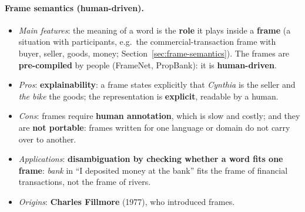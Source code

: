 \paragraph{Frame semantics (human-driven).}
\begin{itemize}[nosep]
  \item \emph{Main features}: the meaning of a word is the \textbf{role} it plays inside
        a \textbf{frame} (a situation with participants, e.g.\ the commercial-transaction
        frame with buyer, seller, goods, money; Section~\ref{sec:frame-semantics}). The
        frames are \textbf{pre-compiled} by people (FrameNet, PropBank): it is
        \textbf{human-driven}.
  \item \emph{Pros}: \textbf{explainability}: a frame states explicitly that \emph{Cynthia}
        is the seller and \emph{the bike} the goods; the representation is
        \textbf{explicit}, readable by a human.
  \item \emph{Cons}: frames require \textbf{human annotation}, which is slow and costly;
        and they are \textbf{not portable}: frames written for one language or domain do
        not carry over to another.
  \item \emph{Applications}: \textbf{disambiguation by checking whether a word fits one
        frame}: \emph{bank} in ``I deposited money at the bank'' fits the frame of
        financial transactions, not the frame of rivers.
  \item \emph{Origins}: \textbf{Charles Fillmore} (1977), who introduced frames.
\end{itemize}

